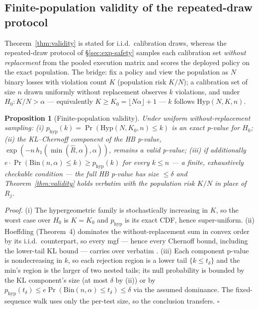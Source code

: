 \documentclass[sigconf,nonacm]{acmart}
\newtheorem{proposition}{Proposition}
\begin{document}
\subsection{Finite-population validity of the repeated-draw protocol}
\label{app:finitepop}
Theorem~\ref{thm:validity} is stated for i.i.d.\ calibration draws,
whereas the repeated-draw protocol of \S\ref{sec:exp-safety} samples
each calibration set \emph{without replacement} from the pooled
execution matrix and scores the deployed policy on the exact
population. The bridge: fix a policy and view the population as $N$
binary losses with violation count $K$ (population risk $K/N$); a
calibration set of size $n$ drawn uniformly without replacement
observes $k$ violations, and under $H_0\colon K/N > \alpha$ ---
equivalently $K \ge K_0 = \lfloor N\alpha\rfloor + 1$ --- $k$ follows
$\mathrm{Hyp}(N, K, n)$.

\begin{proposition}[Finite-population validity]
\label{prop:finitepop}
Under uniform without-replacement sampling: (i)
$p_{\mathrm{hyp}}(k) = \Pr(\mathrm{Hyp}(N, K_0, n) \le k)$ is an exact
p-value for $H_0$; (ii) the KL--Chernoff component of the HB p-value,
$\exp(-n\,h_1(\min(\hat R, \alpha), \alpha))$, remains a valid
p-value; (iii) if additionally $e \cdot \Pr(\mathrm{Bin}(n,\alpha) \le
k) \ge p_{\mathrm{hyp}}(k)$ for every $k \le n$ --- a finite,
exhaustively checkable condition --- the full HB p-value has size
$\le \delta$ and Theorem~\ref{thm:validity} holds verbatim with the
population risk $K/N$ in place of $R_j$.
\end{proposition}

\emph{Proof.} (i) The hypergeometric family is stochastically
increasing in $K$, so the worst case over $H_0$ is $K = K_0$ and
$p_{\mathrm{hyp}}$ is its exact CDF, hence super-uniform. (ii)
Hoeffding \cite{hoeffding1963probability} (Theorem~4) dominates the
without-replacement sum in convex order by its i.i.d.\ counterpart, so
every mgf --- hence every Chernoff bound, including the lower-tail KL
bound --- carries over verbatim \cite{bardenet2015concentration}.
(iii) Each component p-value is nondecreasing in $k$, so each
rejection region is a lower tail $\{k \le t_\delta\}$ and the min's
region is the larger of two nested tails; its null probability is
bounded by the KL component's size (at most $\delta$ by (ii)) or by
$p_{\mathrm{hyp}}(t_\delta) \le e\Pr(\mathrm{Bin}(n,\alpha) \le
t_\delta) \le \delta$ via the assumed dominance. The fixed-sequence
walk uses only the per-test size, so the conclusion transfers.
\hfill$\square$
\end{document}
